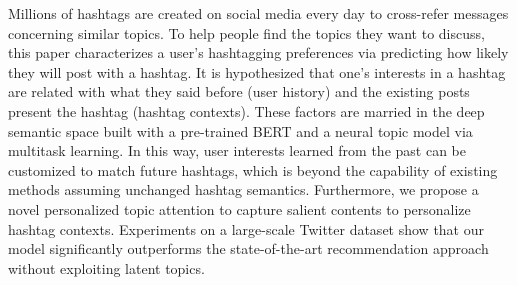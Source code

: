 Millions of hashtags are created on social media every day to cross-refer messages concerning similar topics. To help people find the topics they want to discuss, this paper characterizes a user's hashtagging preferences via predicting how likely they will post with a hashtag. It is hypothesized that one's interests in a hashtag are related with what they said before (user history) and the existing posts present the hashtag (hashtag contexts). These factors are married in the deep semantic space built with a pre-trained BERT and a neural topic model via multitask learning. In this way, user interests learned from the past can be customized to match future hashtags, which is beyond the capability of existing methods assuming unchanged hashtag semantics. Furthermore, we propose a novel personalized topic attention to capture salient contents to personalize hashtag contexts. Experiments on a large-scale Twitter dataset show that our model significantly outperforms the state-of-the-art recommendation approach without exploiting latent topics.
